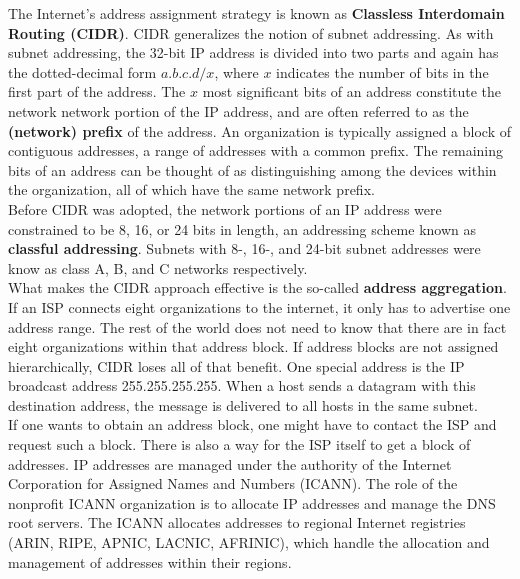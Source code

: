The Internet's address assignment strategy is known as \textbf{Classless Interdomain Routing (CIDR)}. CIDR generalizes the notion of subnet addressing. As with subnet addressing, the 32-bit IP address is divided into two parts and again has the dotted-decimal form $a.b.c.d/x$, where $x$ indicates the number of bits in the first part of the address. The $x$ most significant bits of an address constitute the network network portion of the IP address, and are often referred to as the \textbf{(network) prefix} of the address. An organization is typically assigned a block of contiguous addresses, a range of addresses with a common prefix. The remaining bits of an address can be thought of as distinguishing among the devices within the organization, all of which have the same network prefix.\\
Before CIDR was adopted, the network portions of an IP address were constrained to be 8, 16, or 24 bits in length, an addressing scheme known as \textbf{classful addressing}. Subnets with 8-, 16-, and 24-bit subnet addresses were know as class A, B, and C networks respectively. \\
What makes the CIDR approach effective is the so-called \textbf{address aggregation}. If an ISP connects eight organizations to the internet, it only has to advertise one address range. The rest of the world does not need to know that there are in fact eight organizations within that address block. If address blocks are not assigned hierarchically, CIDR loses all of that benefit. One special address is the IP broadcast address 255.255.255.255. When a host sends a datagram with this destination address, the message is delivered to all hosts in the same subnet.\vspace{.3cm}\\

If one wants to obtain an address block, one might have to contact the ISP and request such a block. There is also a way for the ISP itself to get a block of addresses. IP addresses are managed under the authority of the Internet Corporation for Assigned Names and Numbers (ICANN). The role of the nonprofit ICANN organization is to allocate IP addresses and manage the DNS root servers. The ICANN allocates addresses to regional Internet registries (ARIN, RIPE, APNIC, LACNIC, AFRINIC), which handle the allocation and management of addresses within their regions.

